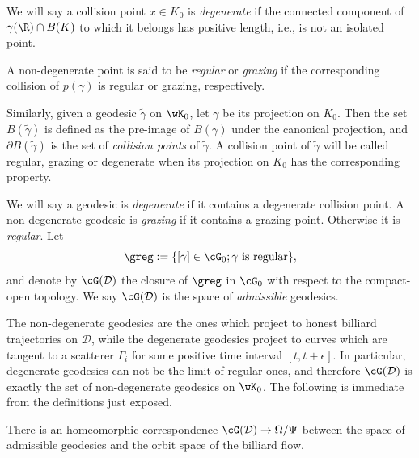\documentclass[reqno,11pt]{amsart}
\begin{document}
    \begin{defi}
        We will say a collision point \( x \in K_0\) is \emph{degenerate} if the connected component of \( \gamma(\R) \cap B(K) \) to which it belongs has positive length, i.e., is not an isolated point.
        \par A non-degenerate point is said to be \emph{regular} or \emph{grazing} if the corresponding collision of \( p(\gamma) \) is regular or grazing, respectively.
        \par Similarly, given a geodesic \(\tilde\gamma\) on \(\wK_0\), let \(\gamma\) be its projection on \(K_0\).
        Then the set \(B(\tilde\gamma)\) is defined as the pre-image of \(B(\gamma)\) under the canonical projection, and \(\partial B(\tilde\gamma)\) is the set of \emph{collision points} of \(\tilde\gamma\).
        A collision point of \(\tilde\gamma\) will be called regular, grazing or degenerate when its projection on \(K_0\) has the corresponding property. 
        \par We will say a geodesic is \emph{degenerate} if it contains a degenerate collision point.
        A non-degenerate geodesic is \emph{grazing} if it contains a grazing point. 
        Otherwise it is \emph{regular}.
        Let
        \[
            \greg := \{ [\gamma] \in \cG_0; \gamma \text{ is regular} \},
        \]
        and denote by \(\cG(\mathcal{D})\) the closure of \(\greg\) in \(\cG_0\) with respect to the compact-open topology.
        We say \(\cG(\mathcal{D})\) is the space of \emph{admissible} geodesics.
    \end{defi}
    The non-degenerate geodesics are the ones which project to honest billiard trajectories on \(\mathcal{D}\), while the degenerate geodesics project to curves which are tangent to a scatterer \(\Gamma_i\) for some positive time interval \([t, t+\epsilon]\).
    In particular, degenerate geodesics can not be the limit of regular ones, and therefore \(\cG(\mathcal{D})\) is exactly the set of non-degenerate geodesics on \(\wK_0\). 
    The following is immediate from the definitions just exposed.
    \begin{lemma}
        There is an homeomorphic correspondence \(\cG(\mathcal{D}) \to \Omega/\Psi \) between the space of admissible geodesics and the orbit space of the billiard flow.
    \end{lemma}
    
\end{document}
